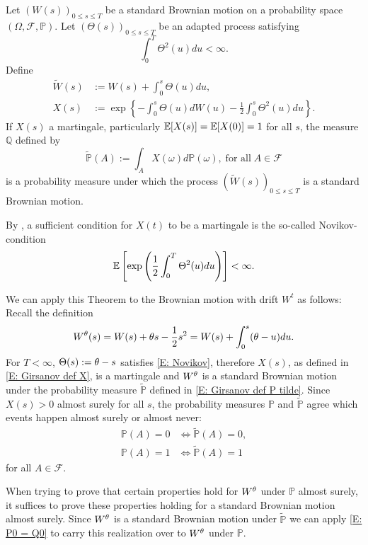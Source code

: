 \begin{theorem} \label{T: Girsanov}
	Let $(W(s))_{0 \leq s \leq T}$ be a standard Brownian motion on a probability space $(\Omega, \mathcal{F}, \mathbb{P})$.
	Let $(\Theta(s))_{0 \leq s \leq T}$ be an adapted process satisfying
	\begin{equation} \label{E: Girsanov cond Theta}
	\int_{0}^{T} \Theta^2(u)du < \infty.
	\end{equation}
	Define
	\begin{align}
	\tilde{W}(s) &:= W(s) + \int_0^s \Theta(u)du, \label{E: Girsanov def W tilde} \\ 
	X(s) &:= \exp \left\{ -\int_{0}^{s} \Theta(u) dW(u) - \frac{1}{2} \int_0^s \Theta^2(u)du \right\}. \label{E: Girsanov def X}
	\end{align}
	If $X(s)$ a martingale, particularly $\mathbb{E}[X(s)] = \mathbb{E}[X(0)] = 1$ for all $s$,
	the measure $\mathbb{Q}$ defined by
	\begin{equation} \label{E: Girsanov def P tilde}
	\tilde{\mathbb{P}}(A) := \int_A X(\omega) d\mathbb{P}(\omega), \; \text{for all} \; A \in \mathcal{F}
	\end{equation}
	is a probability measure under which the process 
	$(\tilde{W}(s))_{0 \leq s \leq T}$
	is a standard Brownian motion.
\end{theorem}

By \cite[Remark 4.2.3, p.66]{Lamberton.2000}, a sufficient condition for $X(t)$ to be a martingale is the so-called Novikov-condition
\begin{equation} \label{E: Novikov}
\mathbb{E} \left[  \exp \left( \frac{1}{2} \int_{0}^{T} \Theta^2(u)du \right)  \right] < \infty.
\end{equation}

We can apply this Theorem to the Brownian motion with drift $W^t$ as follows:
Recall the definition
\begin{equation}
W^{\theta}(s) = W(s) + \theta s - \frac{1}{2} s^2 = W(s) + \int_0^s (\theta-u)du.
\end{equation}
For $T<\infty$, $\Theta(s) := \theta-s$ satisfies \eqref{E: Novikov},
therefore $X(s)$, as defined in \eqref{E: Girsanov def X}, is a martingale and
$W^{\theta}$ is a standard Brownian motion under the probability measure $\tilde{\mathbb{P}}$ defined in \eqref{E: Girsanov def P tilde}.
Since $X(s) > 0$ almost surely for all $s$, 
the probability measures $\mathbb{P}$ and $\tilde{\mathbb{P}}$ agree which events happen almost surely or almost never:
\begin{equation} \label{E: P0 = Q0}
\begin{aligned}
\mathbb{P}(A) = 0 &\iff \tilde{\mathbb{P}}(A) = 0, \\
\mathbb{P}(A) = 1 &\iff \tilde{\mathbb{P}}(A) = 1
\end{aligned}
\end{equation}
for all $A \in \mathcal{F}$.

When trying to prove that certain properties hold for $W^{\theta}$ under $\mathbb{P}$ almost surely,
it suffices to prove these properties holding for a standard Brownian motion almost surely.
Since $W^{\theta}$ is a standard Brownian motion under $\tilde{\mathbb{P}}$ we can apply \eqref{E: P0 = Q0}
to carry this realization over to $W^{\theta}$ under $\mathbb{P}$.
